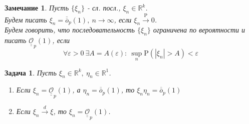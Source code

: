 \documentclass[12pt]{article}
\newtheorem{remark}{Замечание}
\newtheorem*{task}{Задача}
\def\eps{ \varepsilon }
\def\R{ \mathbb{R} }
\def\P{ \mathrm{P} }
\def\littleO{ \overline{\overline{o}} }
\def\bigO{ \underline{\underline{\mathcal{O}}} }
\begin{document}
\begin{remark}
    Пусть $\{\xi_n\}$ - сл. посл., $\xi_n\in\R^k$. \\
    Будем писать $\xi_n=\littleO_p(1),\ n\rightarrow\infty$, если $\xi_n\xrightarrow{\P}0$. \\
    Будем говорить, что последовательность $\{\xi_n\}$ ограничена по вероятности и писать $\bigO_p(1)$, если
    \[\forall\eps>0\ \exists A=A(\eps):\ \sup_n\P(\left\lvert \xi_n\right\rvert >A)<\eps\]
\end{remark}
\begin{task} Пусть $\xi_n\in\R^k,\ \eta_n\in\R^1$.
    \begin{enumerate}
        \item Если $\xi_n=\bigO_p(1)$, а $\eta_n=\littleO_p(1)$, то $\xi_n\eta_n=\littleO_p(1)$
        \item Если $\xi_n\xrightarrow{d}\xi$, то $\xi_n=\bigO_p(1)$.
    \end{enumerate}
\end{task}
\end{document}
